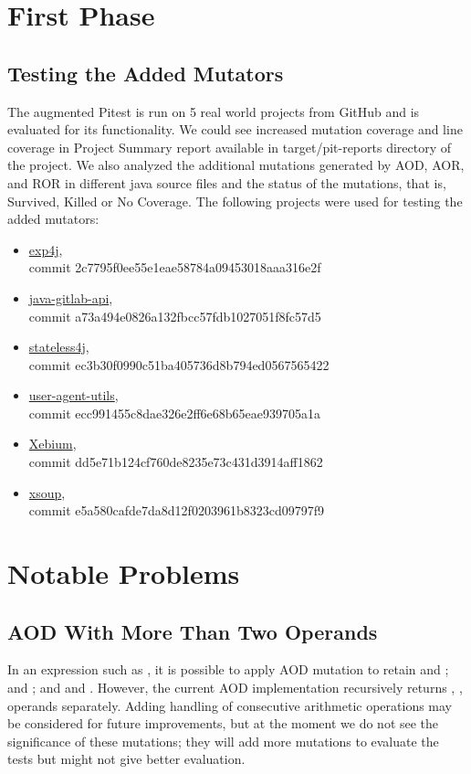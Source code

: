 \section{First Phase}





\subsection{Testing the Added Mutators}
The augmented Pitest is run on 5 real world projects from GitHub and is evaluated for its functionality.
We could see increased mutation coverage and line coverage in Project Summary report available in target/pit-reports directory of the project.
We also analyzed the additional mutations generated by AOD, AOR, and ROR in different java source files and the status of the mutations, that is, Survived, Killed or No Coverage.
The following projects were used for testing the added mutators:
\begin{itemize}
\item
  \href{https://github.com/fasseg/exp4j}{exp4j}, \\
  commit 2c7795f0ee55e1eae58784a09453018aaa316e2f
\item
  \href{https://github.com/timols/java-gitlab-api}{java-gitlab-api}, \\
  commit a73a494e0826a132fbcc57fdb1027051f8fc57d5
\item
  \href{https://github.com/oxo42/stateless4j}{stateless4j}, \\
  commit ec3b30f0990c51ba405736d8b794ed0567565422
\item
  \href{https://github.com/HaraldWalker/user-agent-utils}{user-agent-utils}, \\
  commit ecc991455c8dae326e2ff6e68b65eae939705a1a
\item
  \href{https://github.com/xebia/Xebium}{Xebium}, \\
  commit dd5e71b124cf760de8235e73c431d3914aff1862
\item
  \href{https://github.com/code4craft/xsoup}{xsoup}, \\
  commit e5a580cafde7da8d12f0203961b8323cd09797f9
\end{itemize}

\section{Notable Problems}
\subsection{AOD With More Than Two Operands}
In an expression such as , it is possible to apply AOD mutation to retain  and ;  and ; and  and .
However, the current AOD implementation recursively returns , ,  operands separately.
Adding handling of consecutive arithmetic operations may be considered for future improvements, but at the moment we do not see the significance of these mutations;
they will add more mutations to evaluate the tests but might not give better evaluation.

